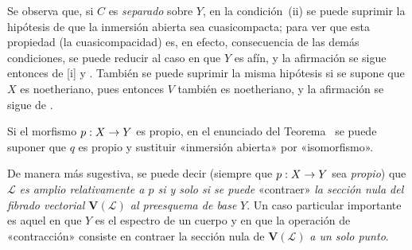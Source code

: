 \documentclass[oneside,10pt]{amsart}
\makeatletter
\newcommand{\ega@arrow}[2]{\mathchoice{#1}{#2}{#2}{#2}}
\renewcommand{\to}{\ega@arrow{\longrightarrow}{\rightarrow}}
\newcommand{\oldpage}[2][]{\marginnote{\normalfont\footnotesize\textbf{#1}~|~#2}\ignorespaces}
\let\EGAOriginalLabel\label
\renewcommand{\label}[1]{\phantomsection\EGAOriginalLabel{#1}}
\makeatother
\begin{document}
Se observa que, si $C$ es \emph{separado} sobre $Y$, en la condición~(ii) se puede suprimir la hipótesis de que la inmersión abierta sea cuasicompacta;
para ver que esta propiedad (la cuasicompacidad) es, en efecto, consecuencia de las demás condiciones, se puede reducir al caso en que $Y$ es afín, y la afirmación se sigue entonces de [i] y .
También se puede suprimir
\oldpage[II]{183}
la misma hipótesis si se supone que $X$ es noetheriano, pues entonces $V$ también es noetheriano, y la afirmación se sigue de .

\begin{corollary}[8.9.2]
\label{II.8.9.2-fr}
Si el morfismo $p:X\to Y$ es propio, en el enunciado del Teorema~ se puede suponer que $q$ es propio y sustituir «inmersión abierta» por «isomorfismo».
\end{corollary}

De manera más sugestiva, se puede decir (siempre que $p:X\to Y$ sea \emph{propio}) que $\mathcal{L}$ \emph{es amplio relativamente a $p$ si y solo si se puede} «contraer» \emph{la sección nula del fibrado vectorial $\mathbf{V}(\mathcal{L})$ al preesquema de base} $Y$.
Un caso particular importante es aquel en que $Y$ es el espectro de un cuerpo y en que la operación de «contracción» consiste en contraer la sección nula de $\mathbf{V}(\mathcal{L})$ \emph{a un solo punto}.
\end{document}
